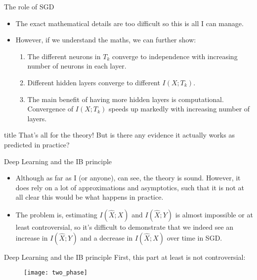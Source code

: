 \documentclass{beamer}
\begin{document}
\begin{frame}{The role of SGD}
\begin{itemize}
	\item The exact mathematical details are too difficult so this is all I can manage. 
	\item However, if we understand the maths, we can further show: 
	\begin{enumerate}
	\item The different neurons in $T_k$ converge to independence with increasing number of neurons in each layer. 
	\item Different hidden layers converge to different  $I(X;T_k)$.
	\item The main benefit of having more hidden layers is computational. Convergence of $I(X;T_k)$ speeds up markedly with increasing number of layers.
	\end{enumerate}
\end{itemize}
\end{frame}

\begin{frame}
\vfill
\centering
\begin{beamercolorbox}[sep=8pt,center,shadow=true,rounded=true]{title}
	That's all for the theory! But is there any evidence it actually works as predicted in practice? 
	\par%
\end{beamercolorbox}
\vfill
\end{frame}

\begin{frame}{Deep Learning and the IB principle}
\begin{itemize}
	\item Although as far as I (or anyone), can see, the theory is sound. However, it does rely on a lot of approximations and asymptotics, such that it is not at all clear this would be what happens in practice. 
	\item The problem is, estimating $I(\hat{X}; X)$ and $I(\hat{X}; Y)$ is almost impossible or at least controversial, so it's difficult to demonstrate that we indeed see an increase in $I(\hat{X}; Y)$ and a decrease in $I(\hat{X}; X)$ over time in SGD. 
\end{itemize}
\end{frame}

\begin{frame}{Deep Learning and the IB principle}
First, this part at least is not controversial: 
\begin{figure}
	\centering
	\texttt{[image: two\_phase]}
	\label{fig:twophase}
\end{figure}
\end{frame}
\end{document}
